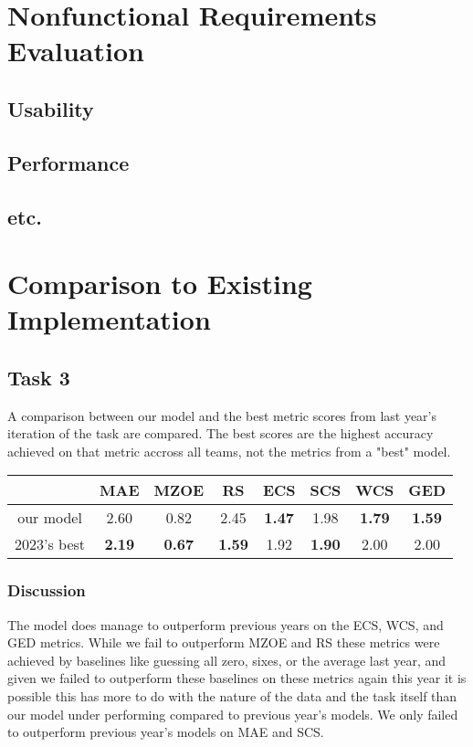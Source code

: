\documentclass[12pt, titlepage]{article}
\begin{document}
\section{Nonfunctional Requirements Evaluation}

\subsection{Usability}
		
\subsection{Performance}

\subsection{etc.}
	
\section{Comparison to Existing Implementation}	

\subsection{Task 3}
A comparison between our model and the best metric scores from last year's iteration of the task are compared. The best scores are the highest accuracy achieved on that metric accross all teams, not the metrics from a "best" model.

\begin{tabular}{c|ccccccc}
  &  MAE   & MZOE  & RS    & ECS   & SCS   & WCS   & GED \\ \hline
our model  & 2.60  & 0.82  & 2.45  & \textbf{1.47}  & 1.98  & \textbf{1.79}  & \textbf{1.59} \\
2023's best  & \textbf{2.19}  & \textbf{0.67}  & \textbf{1.59}  & 1.92  & \textbf{1.90}  & 2.00  & 2.00 \\
\end{tabular}

\subsubsection{Discussion}
The model does manage to outperform previous years on the ECS, WCS, and GED metrics. While we fail to outperform MZOE and RS these metrics were achieved by baselines like guessing all zero, sixes, or the average last year, and given we failed to outperform these baselines on these metrics again this year it is possible this has more to do with the nature of the data and the task itself than our model under performing compared to previous year's models. We only failed to outperform previous year's models on MAE and SCS.
\end{document}
